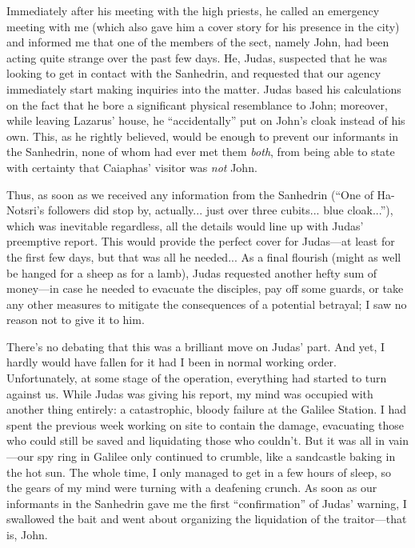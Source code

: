 Immediately after his meeting with the high priests, he called an emergency meeting with me (which also gave him a cover story for his presence in the city) and informed me that one of the members of the sect, namely John, had been acting quite strange over the past few days. He, Judas, suspected that he was looking to get in contact with the Sanhedrin, and requested that our agency immediately start making inquiries into the matter. Judas based his calculations on the fact that he bore a significant physical resemblance to John; moreover, while leaving Lazarus' house, he ``accidentally'' put on John's cloak instead of his own. This, as he rightly believed, would be enough to prevent our informants in the Sanhedrin, none of whom had ever met them \emph{both}, from being able to state with certainty that Caiaphas' visitor was \emph{not} John.

Thus, as soon as we received any information from the Sanhedrin (``One of Ha-Notsri's followers did stop by, actually... just over three cubits... blue cloak...''), which was inevitable regardless, all the details would line up with Judas' preemptive report. This would provide the perfect cover for Judas---at least for the first few days, but that was all he needed... As a final flourish (might as well be hanged for a sheep as for a lamb), Judas requested another hefty sum of money---in case he needed to evacuate the disciples, pay off some guards, or take any other measures to mitigate the consequences of a potential betrayal; I saw no reason not to give it to him.

There's no debating that this was a brilliant move on Judas' part. And yet, I hardly would have fallen for it had I been in normal working order. Unfortunately, at some stage of the operation, everything had started to turn against us. While Judas was giving his report, my mind was occupied with another thing entirely: a catastrophic, bloody failure at the Galilee Station. I had spent the previous week working on site to contain the damage, evacuating those who could still be saved and liquidating those who couldn't. But it was all in vain---our spy ring in Galilee only continued to crumble, like a sandcastle baking in the hot sun. The whole time, I only managed to get in a few hours of sleep, so the gears of my mind were turning with a deafening crunch. As soon as our informants in the Sanhedrin gave me the first ``confirmation'' of Judas' warning, I swallowed the bait and went about organizing the liquidation of the traitor---that is, John.

